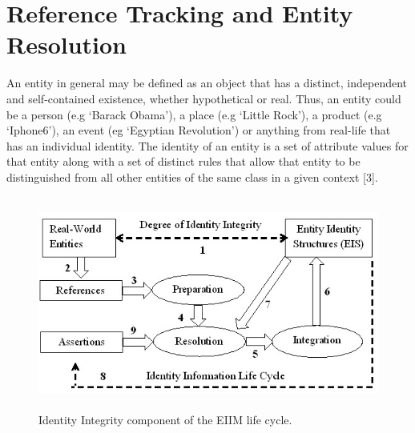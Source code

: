 
\section{Reference Tracking and Entity Resolution}

An entity in general may be defined as an object that has a distinct, independent and self-contained existence, whether hypothetical or real. Thus, an entity could be a person (e.g `Barack Obama'), a place (e.g `Little Rock'), a product (e.g `Iphone6'), an event (eg `Egyptian Revolution') or anything from real-life that has an individual identity. The identity of an entity is a set of attribute values for that entity along with a set of distinct rules that allow that entity to be distinguished from all other entities of the same class in a given context [3].


\begin{figure}[htbp]
  \caption{Identity Integrity component of the EIIM life cycle.}
  \centering
    \includegraphics[width=14cm,height=7cm]{Figures/OriginalEIIM.jpg}
\end{figure} 

